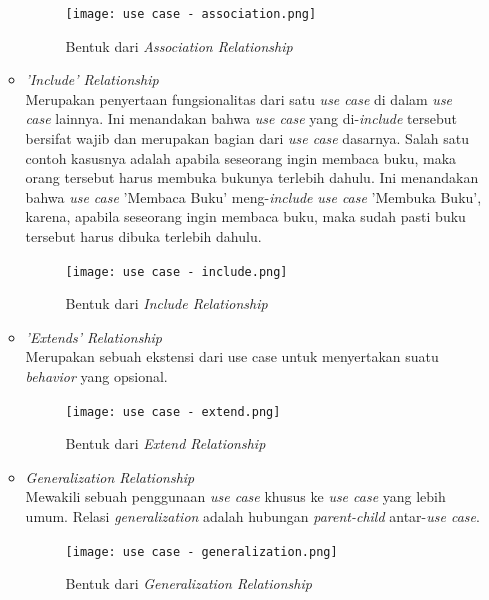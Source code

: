 \documentclass[a4paper]{article}
\begin{document}
\begin{enumerate}
\begin{itemize}
        \begin{figure}[h]
            \centering
            \texttt{[image: use case - association.png]}
            \caption{Bentuk dari \textit{Association Relationship}}
        \end{figure}
        \item \textit{'Include' Relationship}\\
        Merupakan penyertaan fungsionalitas dari satu \textit{use case} di dalam \textit{use case} lainnya\autocite{systemanalysisdesign-use-case-diagram}. Ini menandakan bahwa \textit{use case} yang di-\textit{include}  tersebut bersifat wajib dan merupakan bagian dari \textit{use case} dasarnya. Salah satu contoh kasusnya adalah apabila seseorang ingin membaca buku, maka orang tersebut harus membuka bukunya terlebih dahulu. Ini menandakan bahwa \textit{use case} 'Membaca Buku' meng-\textit{include} \textit{use case} 'Membuka Buku', karena, apabila seseorang ingin membaca buku, maka sudah pasti buku tersebut harus dibuka terlebih dahulu\autocite{educativeio-include-extend-usecase}.
        \begin{figure}[h]
            \centering
            \texttt{[image: use case - include.png]}
            \caption{Bentuk dari \textit{Include Relationship}}
        \end{figure}
        \newpage
        \item \textit{'Extends' Relationship}\\
        Merupakan sebuah ekstensi dari use case untuk menyertakan suatu \textit{behavior} yang opsional\autocite{systemanalysisdesign-use-case-diagram}.
        \begin{figure}[h]
            \centering
            \texttt{[image: use case - extend.png]}
            \caption{Bentuk dari \textit{Extend Relationship}}
        \end{figure}
        \item \textit{Generalization Relationship}\\
        Mewakili sebuah penggunaan \textit{use case} khusus ke \textit{use case} yang lebih umum\autocite{systemanalysisdesign-use-case-diagram}. Relasi \textit{generalization} adalah hubungan \textit{parent-child} antar-\textit{use case}\autocite{what-is-usecase-diagram}.
        \begin{figure}[h]
            \centering
            \texttt{[image: use case - generalization.png]}
            \caption{Bentuk dari \textit{Generalization Relationship}}
        \end{figure}

\end{itemize}
\end{enumerate}
\end{document}
